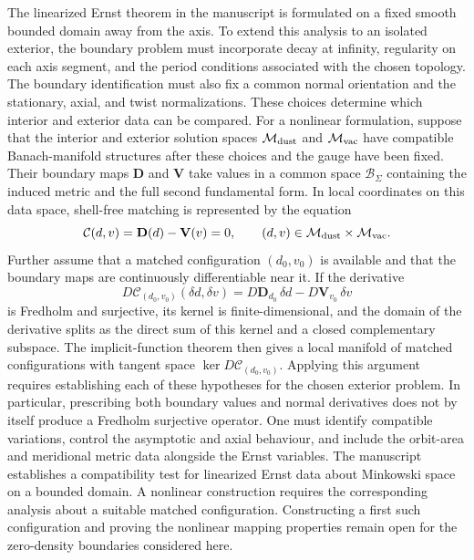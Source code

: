 \documentclass[11pt,a4paper]{article}
\numberwithin{equation}{section}
\theoremstyle{plain}
\theoremstyle{definition}
\theoremstyle{remark}
\begin{document}
The linearized Ernst theorem in the manuscript is formulated on a fixed smooth bounded domain away from the axis. To extend this analysis to an isolated exterior, the boundary problem must incorporate decay at infinity, regularity on each axis segment, and the period conditions associated with the chosen topology. The boundary identification must also fix a common normal orientation and the stationary, axial, and twist normalizations. These choices determine which interior and exterior data can be compared. For a nonlinear formulation, suppose that the interior and exterior solution spaces $\mathcal M_{\rm dust}$ and $\mathcal M_{\rm vac}$ have compatible Banach-manifold structures after these choices and the gauge have been fixed. Their boundary maps $\mathbf D$ and $\mathbf V$ take values in a common space $\mathcal B_\Sigma$ containing the induced metric and the full second fundamental form. In local coordinates on this data space, shell-free matching is represented by the equation
\begin{equation}\label{eq:nonlinear-matching-residual}
\mathcal C(d,v)=\mathbf D(d)-\mathbf V(v)=0,
\qquad (d,v)\in\mathcal M_{\rm dust}\times\mathcal M_{\rm vac}.
\end{equation}
Further assume that a matched configuration $(d_0,v_0)$ is available and that the boundary maps are continuously differentiable near it. If the derivative
\begin{equation}\label{eq:linearized-full-matching-map}
D\mathcal C_{(d_0,v_0)}(\delta d,\delta v)=D\mathbf D_{d_0}\,\delta d-D\mathbf V_{v_0}\,\delta v
\end{equation}
is Fredholm and surjective, its kernel is finite-dimensional, and the domain of the derivative splits as the direct sum of this kernel and a closed complementary subspace. The implicit-function theorem then gives a local manifold of matched configurations with tangent space $\ker D\mathcal C_{(d_0,v_0)}$. Applying this argument requires establishing each of these hypotheses for the chosen exterior problem. In particular, prescribing both boundary values and normal derivatives does not by itself produce a Fredholm surjective operator. One must identify compatible variations, control the asymptotic and axial behaviour, and include the orbit-area and meridional metric data alongside the Ernst variables. The manuscript establishes a compatibility test for linearized Ernst data about Minkowski space on a bounded domain. A nonlinear construction requires the corresponding analysis about a suitable matched configuration. Constructing a first such configuration and proving the nonlinear mapping properties remain open for the zero-density boundaries considered here.
\end{document}
